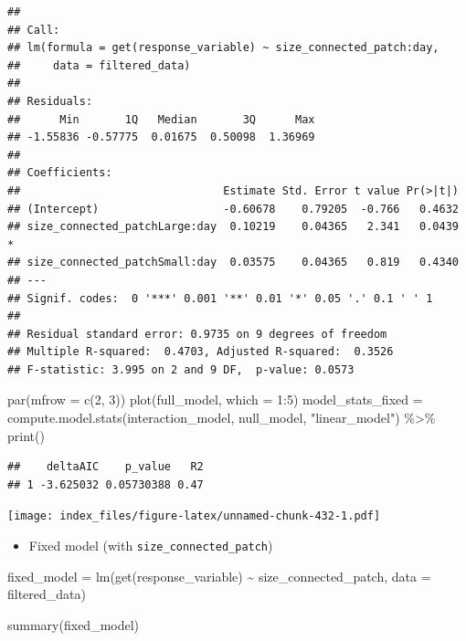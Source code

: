 \documentclass[
]{article}
\newenvironment{Shaded}{\begin{snugshade}}{\end{snugshade}}
\newcommand{\AttributeTok}[1]{\textcolor[rgb]{0.77,0.63,0.00}{#1}}
\newcommand{\DecValTok}[1]{\textcolor[rgb]{0.00,0.00,0.81}{#1}}
\newcommand{\FunctionTok}[1]{\textcolor[rgb]{0.00,0.00,0.00}{#1}}
\newcommand{\NormalTok}[1]{#1}
\newcommand{\OtherTok}[1]{\textcolor[rgb]{0.56,0.35,0.01}{#1}}
\newcommand{\SpecialCharTok}[1]{\textcolor[rgb]{0.00,0.00,0.00}{#1}}
\newcommand{\StringTok}[1]{\textcolor[rgb]{0.31,0.60,0.02}{#1}}
\providecommand{\tightlist}{%
  \setlength{\itemsep}{0pt}\setlength{\parskip}{0pt}}
\begin{document}
\begin{verbatim}
## 
## Call:
## lm(formula = get(response_variable) ~ size_connected_patch:day, 
##     data = filtered_data)
## 
## Residuals:
##      Min       1Q   Median       3Q      Max 
## -1.55836 -0.57775  0.01675  0.50098  1.36969 
## 
## Coefficients:
##                               Estimate Std. Error t value Pr(>|t|)  
## (Intercept)                   -0.60678    0.79205  -0.766   0.4632  
## size_connected_patchLarge:day  0.10219    0.04365   2.341   0.0439 *
## size_connected_patchSmall:day  0.03575    0.04365   0.819   0.4340  
## ---
## Signif. codes:  0 '***' 0.001 '**' 0.01 '*' 0.05 '.' 0.1 ' ' 1
## 
## Residual standard error: 0.9735 on 9 degrees of freedom
## Multiple R-squared:  0.4703, Adjusted R-squared:  0.3526 
## F-statistic: 3.995 on 2 and 9 DF,  p-value: 0.0573
\end{verbatim}

\begin{Shaded}
\begin{Highlighting}[]
\FunctionTok{par}\NormalTok{(}\AttributeTok{mfrow =} \FunctionTok{c}\NormalTok{(}\DecValTok{2}\NormalTok{, }\DecValTok{3}\NormalTok{))}
\FunctionTok{plot}\NormalTok{(full\_model, }\AttributeTok{which =} \DecValTok{1}\SpecialCharTok{:}\DecValTok{5}\NormalTok{)}
\NormalTok{model\_stats\_fixed }\OtherTok{=} \FunctionTok{compute.model.stats}\NormalTok{(interaction\_model,}
\NormalTok{                                        null\_model,}
                                        \StringTok{"linear\_model"}\NormalTok{) }\SpecialCharTok{\%\textgreater{}\%}
  \FunctionTok{print}\NormalTok{()}
\end{Highlighting}
\end{Shaded}

\begin{verbatim}
##    deltaAIC    p_value   R2
## 1 -3.625032 0.05730388 0.47
\end{verbatim}

\texttt{[image: index\_files/figure-latex/unnamed-chunk-432-1.pdf]}

\begin{itemize}
\tightlist
\item
  Fixed model (with \texttt{size\_connected\_patch})
\end{itemize}

\begin{Shaded}
\begin{Highlighting}[]
\NormalTok{fixed\_model }\OtherTok{=} \FunctionTok{lm}\NormalTok{(}\FunctionTok{get}\NormalTok{(response\_variable) }\SpecialCharTok{\textasciitilde{}}
\NormalTok{                   size\_connected\_patch,}
                 \AttributeTok{data =}\NormalTok{ filtered\_data)}

\FunctionTok{summary}\NormalTok{(fixed\_model)}
\end{Highlighting}
\end{Shaded}
\end{document}
